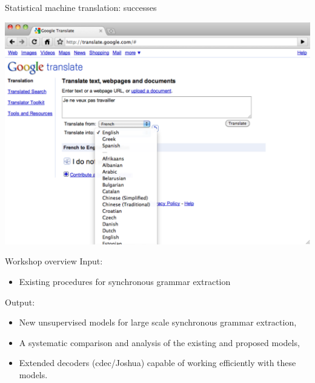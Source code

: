 \documentclass{beamer}
\begin{document}
\begin{frame}[t]{Statistical machine translation: successes}
\begin{center}
  \includegraphics[scale=0.35]{GoogleTranslateLanguages.pdf}
\end{center}
\end{frame}

\begin{frame}[t]{Workshop overview}
Input:
  \begin{itemize}
  \item Existing procedures for synchronous grammar extraction
  \end{itemize}
\vspace{0.3in}
Output:
  \begin{itemize}
    \item New unsupervised models for large scale synchronous grammar extraction,
    \item A systematic comparison and analysis of the existing and proposed models,
    \item Extended decoders (cdec/Joshua) capable of working efficiently with these models.
  \end{itemize}
\end{frame}
\end{document}
